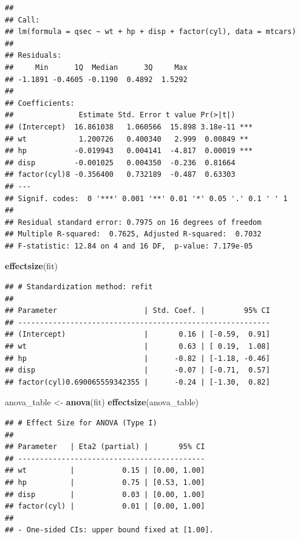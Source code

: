 \documentclass[
]{article}
\newenvironment{Shaded}{\begin{snugshade}}{\end{snugshade}}
\newcommand{\FunctionTok}[1]{\textcolor[rgb]{0.13,0.29,0.53}{\textbf{#1}}}
\newcommand{\NormalTok}[1]{#1}
\newcommand{\OtherTok}[1]{\textcolor[rgb]{0.56,0.35,0.01}{#1}}
\begin{document}
\begin{verbatim}
## 
## Call:
## lm(formula = qsec ~ wt + hp + disp + factor(cyl), data = mtcars)
## 
## Residuals:
##     Min      1Q  Median      3Q     Max 
## -1.1891 -0.4605 -0.1190  0.4892  1.5292 
## 
## Coefficients:
##               Estimate Std. Error t value Pr(>|t|)    
## (Intercept)  16.861038   1.060566  15.898 3.18e-11 ***
## wt            1.200726   0.400340   2.999  0.00849 ** 
## hp           -0.019943   0.004141  -4.817  0.00019 ***
## disp         -0.001025   0.004350  -0.236  0.81664    
## factor(cyl)8 -0.356400   0.732189  -0.487  0.63303    
## ---
## Signif. codes:  0 '***' 0.001 '**' 0.01 '*' 0.05 '.' 0.1 ' ' 1
## 
## Residual standard error: 0.7975 on 16 degrees of freedom
## Multiple R-squared:  0.7625, Adjusted R-squared:  0.7032 
## F-statistic: 12.84 on 4 and 16 DF,  p-value: 7.179e-05
\end{verbatim}

\begin{Shaded}
\begin{Highlighting}[]
\FunctionTok{effectsize}\NormalTok{(fit)}
\end{Highlighting}
\end{Shaded}

\begin{verbatim}
## # Standardization method: refit
## 
## Parameter                    | Std. Coef. |         95% CI
## ----------------------------------------------------------
## (Intercept)                  |       0.16 | [-0.59,  0.91]
## wt                           |       0.63 | [ 0.19,  1.08]
## hp                           |      -0.82 | [-1.18, -0.46]
## disp                         |      -0.07 | [-0.71,  0.57]
## factor(cyl)0.690065559342355 |      -0.24 | [-1.30,  0.82]
\end{verbatim}

\begin{Shaded}
\begin{Highlighting}[]
\NormalTok{anova\_table }\OtherTok{\textless{}{-}} \FunctionTok{anova}\NormalTok{(fit)}
\FunctionTok{effectsize}\NormalTok{(anova\_table)}
\end{Highlighting}
\end{Shaded}

\begin{verbatim}
## # Effect Size for ANOVA (Type I)
## 
## Parameter   | Eta2 (partial) |       95% CI
## -------------------------------------------
## wt          |           0.15 | [0.00, 1.00]
## hp          |           0.75 | [0.53, 1.00]
## disp        |           0.03 | [0.00, 1.00]
## factor(cyl) |           0.01 | [0.00, 1.00]
## 
## - One-sided CIs: upper bound fixed at [1.00].
\end{verbatim}
\end{document}
